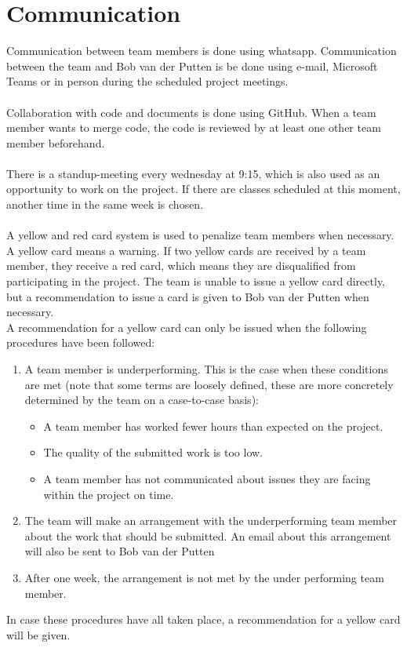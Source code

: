 \documentclass{article} %
\begin{document}
\newpage

\section{Communication}
Communication between team members is done using whatsapp.
Communication between the team and Bob van der Putten
is be done using e-mail, Microsoft Teams or in person during the scheduled project meetings.
\\\\
Collaboration with code and documents is done using GitHub.
When a team member wants to merge code, the code is reviewed by at least one other team member beforehand.
\\\\
There is a standup-meeting every wednesday at 9:15, which is also used as an opportunity to work on the project. If there are classes scheduled at this moment, another time in the same week is chosen.
\\\\
A yellow and red card system is used to penalize team members when necessary.
A yellow card means a warning. If two yellow cards are received by a team member, they receive a red card, which means
they are disqualified from participating in the project.
The team is unable to issue a yellow card directly, but a recommendation to issue a card
is given to Bob van der Putten when necessary.
\\
A recommendation for a yellow card can only be issued when the following procedures have been followed:
\begin{enumerate}
    \item A team member is underperforming. This is the case when these conditions are met (note that some terms are loosely defined, these are more concretely determined by the team on a case-to-case basis):
          \begin{itemize}
              \item A team member has worked fewer hours than expected on the project.
              \item The quality of the submitted work is too low.
              \item A team member has not communicated about issues they are facing within the project on time.
          \end{itemize}
    \item The team will make an arrangement with the underperforming team member about the work that should be submitted.
          An email about this arrangement will also be sent to Bob van der Putten
    \item After one week, the arrangement is not met by the under performing team member.
\end{enumerate}
In case these procedures have all taken place, a recommendation for a yellow card will be given.
\end{document}
